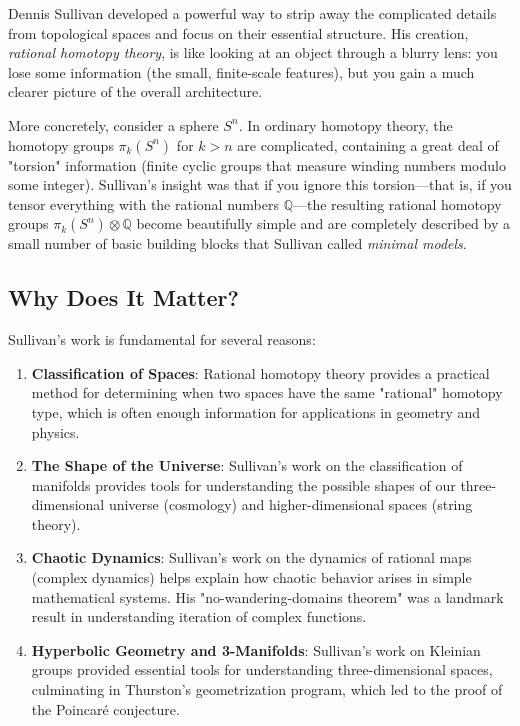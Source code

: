Dennis Sullivan developed a powerful way to strip away the complicated details from topological spaces and focus on their essential structure. His creation, \emph{rational homotopy theory}, is like looking at an object through a blurry lens: you lose some information (the small, finite-scale features), but you gain a much clearer picture of the overall architecture.

More concretely, consider a sphere $S^n$. In ordinary homotopy theory, the homotopy groups $\pi_k(S^n)$ for $k > n$ are complicated, containing a great deal of "torsion" information (finite cyclic groups that measure winding numbers modulo some integer). Sullivan's insight was that if you ignore this torsion---that is, if you tensor everything with the rational numbers $\mathbb{Q}$---the resulting rational homotopy groups $\pi_k(S^n) \otimes \mathbb{Q}$ become beautifully simple and are completely described by a small number of basic building blocks that Sullivan called \emph{minimal models}.

\subsection{Why Does It Matter?}

Sullivan's work is fundamental for several reasons:

\begin{enumerate}
\item \textbf{Classification of Spaces}: Rational homotopy theory provides a practical method for determining when two spaces have the same "rational" homotopy type, which is often enough information for applications in geometry and physics.

\item \textbf{The Shape of the Universe}: Sullivan's work on the classification of manifolds provides tools for understanding the possible shapes of our three-dimensional universe (cosmology) and higher-dimensional spaces (string theory).

\item \textbf{Chaotic Dynamics}: Sullivan's work on the dynamics of rational maps (complex dynamics) helps explain how chaotic behavior arises in simple mathematical systems. His "no-wandering-domains theorem" was a landmark result in understanding iteration of complex functions.

\item \textbf{Hyperbolic Geometry and 3-Manifolds}: Sullivan's work on Kleinian groups provided essential tools for understanding three-dimensional spaces, culminating in Thurston's geometrization program, which led to the proof of the Poincar\'e conjecture.
\end{enumerate}


